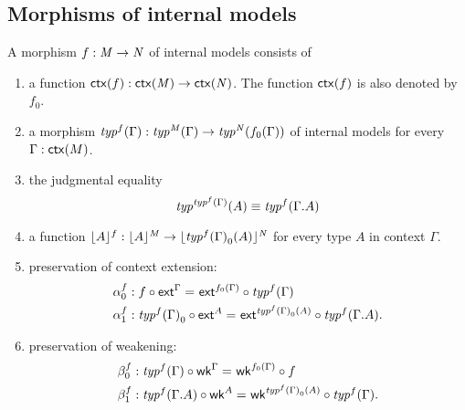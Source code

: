 \subsection{Morphisms of internal models}
\begin{defn}\label{defn:premodel-morphism}
A morphism $f:\mfM\to \mfN$ of internal models consists of
\begin{enumerate}
\item a function $\ctx(f):\ctx(\mfM)\to\ctx(\mfN)$. The function $\ctx(f)$ is also
denoted by $f_0$.
\item a morphism $\mftyp{f}{\Gamma}:\mftyp{\mfM}{\Gamma}\to\mftyp{\mfN}{f_0(\Gamma)}$ of internal models for every
$\Gamma:\ctx(M)$.
\item the judgmental equality
\begin{equation*}
\mftyp{\mftyp{f}{\Gamma}}{A}\jdeq\mftyp{f}{\ctxext{\Gamma}{A}}
\end{equation*}
\item a function $\terms[f]{A}:\terms[\mfM]{A}\to\terms[\mfN]{\mftyp{f}{\Gamma}_0(A)}$ for
every type $A$ in context $\Gamma$. 
\item preservation of context extension: 
\begin{align*}
\alpha^f_0 & :\id{f\circ\tfext^\Gamma}{\tfext^{f_0(\Gamma)}\circ\mftyp{f}{\Gamma}}\\
\alpha^f_1 & :\id{\mftyp{f}{\Gamma}_0\circ\tfext^A}{\tfext^{\mftyp{f}{\Gamma}_0(A)}\circ\mftyp{f}{\ctxext{\Gamma}{A}}}.
\end{align*}
\begin{comment}
the judgmental equality
\begin{equation*}
f_0(\ctxext{\Gamma}{A})\jdeq\ctxext{f_0(\Gamma)}\mftyp{f}{\Gamma}_0(A)
\end{equation*}
for every type $A$ in context $\Gamma$.
\end{comment}
\item preservation of weakening: 
\begin{align*}
\beta^f_0 & :\id{\mftyp{f}{\Gamma}\circ\tfwk^\Gamma}{\tfwk^{f_0(\Gamma)}\circ f}\\
\beta^f_1 & :\id{\mftyp{f}{\ctxext{\Gamma}{A}}\circ\tfwk^A}{\tfwk^\protect{\mftyp{f}{\Gamma}_0(A)}\circ\mftyp{f}{\Gamma}}.
\end{align*}
\begin{comment}
This gives the following three judgmental equalities:
\begin{enumerate}
\item the judgmental equality
\begin{equation*}

\end{comment}
\end{enumerate}
\end{defn}
